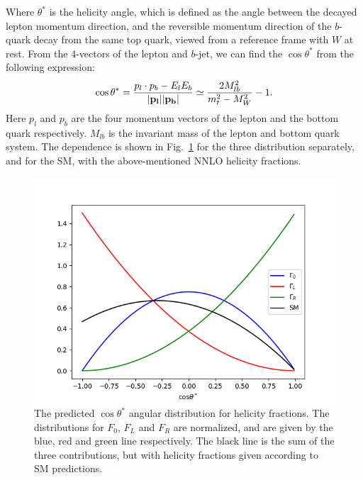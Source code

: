 \documentclass[12pt,a4paper]{article}
\numberwithin{equation}{section}
\begin{document}
Where $\theta^*$ is the helicity angle, which is defined as the angle between the
decayed lepton momentum direction, and the reversible momentum direction of the
$b$-quark decay from the same top quark, viewed from a reference frame with $W$
at rest\cite{PhysRevD.45.124}. From the 4-vectors of the lepton and $b$-jet, we
can find the $\cos \theta^*$ from the following expression:
\begin{equation}
  \cos \theta^*=\frac{p_l\cdot p_b-E_lE_b}{\abs{\vb{p_l}}\abs{\vb{p_b}}} \simeq \frac{2 M_{lb}^2}{m_t^2 - M_W^2} - 1. \label{eq:costheta}
\end{equation}
Here $p_l$ and $p_b$ are the four momentum vectors of the lepton and the bottom
quark respectively. $M_{lb}$ is the invariant mass of the lepton and bottom
quark system. The dependence is shown in Fig.~\ref{fig:distributions} for the
three distribution separately, and for the SM, with the above-mentioned NNLO
helicity fractions.
\begin{figure}[H]
  \centering
	\includegraphics[width=0.7\linewidth]{figures/angular_dist.png}
	\caption{The predicted $\cos \theta^{*}$ angular distribution for helicity
    fractions. The distributions for $F_{0}$, $F_{L}$ and $F_{R}$ are
    normalized, and are given by the blue, red and green line respectively. The
    black line is the sum of the three contributions, but with helicity
    fractions given according to SM predictions.}\label{fig:distributions}
\end{figure}
\end{document}
